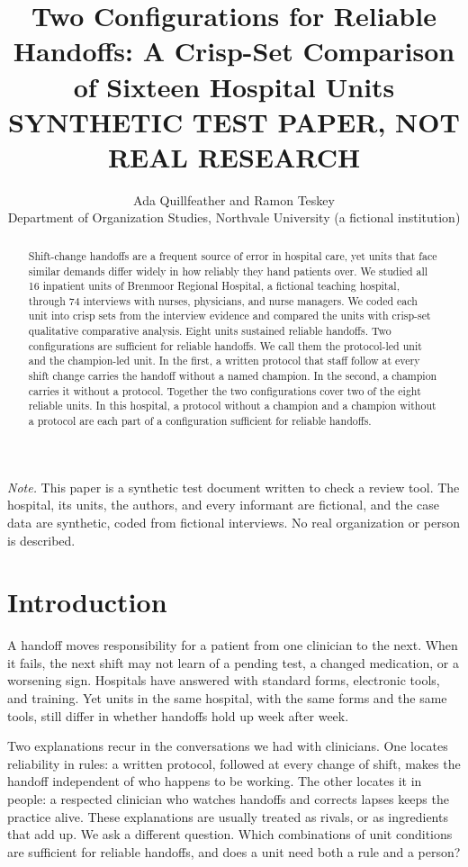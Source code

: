 \documentclass[12pt]{article}
\title{Two Configurations for Reliable Handoffs: A Crisp-Set Comparison of Sixteen Hospital Units\\[1em]
\normalsize\textbf{SYNTHETIC TEST PAPER, NOT REAL RESEARCH}}
\author{Ada Quillfeather and Ramon Teskey\\
\small Department of Organization Studies, Northvale University (a fictional institution)}
\date{}
\begin{document}
\maketitle
\thispagestyle{empty}

\noindent\textit{Note.} This paper is a synthetic test document written to check a review tool. The hospital, its units, the authors, and every informant are fictional, and the case data are synthetic, coded from fictional interviews. No real organization or person is described.

\begin{abstract}
\noindent Shift-change handoffs are a frequent source of error in hospital care, yet units that face similar demands differ widely in how reliably they hand patients over. We studied all 16 inpatient units of Brenmoor Regional Hospital, a fictional teaching hospital, through 74 interviews with nurses, physicians, and nurse managers. We coded each unit into crisp sets from the interview evidence and compared the units with crisp-set qualitative comparative analysis. Eight units sustained reliable handoffs. Two configurations are sufficient for reliable handoffs. We call them the protocol-led unit and the champion-led unit. In the first, a written protocol that staff follow at every shift change carries the handoff without a named champion. In the second, a champion carries it without a protocol. Together the two configurations cover two of the eight reliable units. In this hospital, a protocol without a champion and a champion without a protocol are each part of a configuration sufficient for reliable handoffs.
\end{abstract}

\newpage
\section{Introduction}

A handoff moves responsibility for a patient from one clinician to the next. When it fails, the next shift may not learn of a pending test, a changed medication, or a worsening sign. Hospitals have answered with standard forms, electronic tools, and training. Yet units in the same hospital, with the same forms and the same tools, still differ in whether handoffs hold up week after week.

Two explanations recur in the conversations we had with clinicians. One locates reliability in rules: a written protocol, followed at every change of shift, makes the handoff independent of who happens to be working. The other locates it in people: a respected clinician who watches handoffs and corrects lapses keeps the practice alive. These explanations are usually treated as rivals, or as ingredients that add up. We ask a different question. Which combinations of unit conditions are sufficient for reliable handoffs, and does a unit need both a rule and a person?
\end{document}
